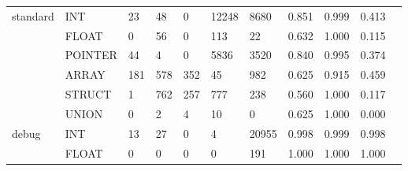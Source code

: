 \begin{table}
\begin{tabular}{lp{1.43cm}p{1.10cm}p{1.10cm}p{1.10cm}p{1.10cm}p{1.10cm}p{1.10cm}p{1.10cm}p{1.10cm}p{1.10cm}}
\cline{1-10}
\multirow{6}{*}{standard} & INT &                                 23 &                                48 &                                0 &                             12248 &                            8680 &                     0.851 &                                 0.999 &                               0.413 \\
      & FLOAT &                                  0 &                                56 &                                0 &                               113 &                              22 &                     0.632 &                                 1.000 &                               0.115 \\
      & POINTER &                                 44 &                                 4 &                                0 &                              5836 &                            3520 &                     0.840 &                                 0.995 &                               0.374 \\
      & ARRAY &                                181 &                               578 &                              352 &                                45 &                             982 &                     0.625 &                                 0.915 &                               0.459 \\
      & STRUCT &                                  1 &                               762 &                              257 &                               777 &                             238 &                     0.560 &                                 1.000 &                               0.117 \\
      & UNION &                                  0 &                                 2 &                                4 &                                10 &                               0 &                     0.625 &                                 1.000 &                               0.000 \\
\cline{1-10}
\multirow{6}{*}{debug} & INT &                                 13 &                                27 &                                0 &                                 4 &                           20955 &                     0.998 &                                 0.999 &                               0.998 \\
      & FLOAT &                                  0 &                                 0 &                                0 &                                 0 &                             191 &                     1.000 &                                 1.000 &                               1.000 \\

\end{tabular}
\end{table}
